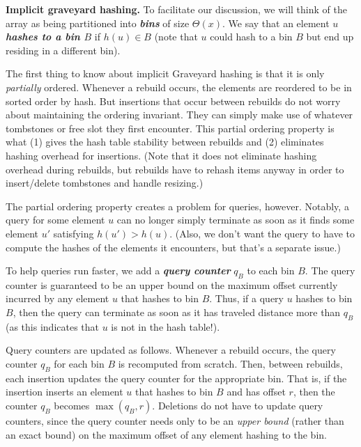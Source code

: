 \documentclass[10pt]{article}
\theoremstyle{remark}
\theoremstyle{remark}
\newcommand{\defn}[1]{\textbf{\emph{#1}}}
\renewcommand{\paragraph}[1]{\vspace{.2 cm} \noindent \textbf{#1}}
\begin{document}
\paragraph{Implicit graveyard hashing.}
To facilitate our discussion, we will think of the array as being partitioned into \defn{bins} of size $\Theta(x)$. We say that an element $u$ \defn{hashes to a bin $B$} if $h(u) \in B$ (note that $u$ could hash to a bin $B$ but end up residing in a different bin). 

The first thing to know about implicit Graveyard hashing is that it is only \emph{partially} ordered. Whenever a rebuild occurs, the elements are reordered to be in sorted order by hash. But insertions that occur between rebuilds do not worry about maintaining the ordering invariant. They can simply make use of whatever tombstones or free slot they first encounter. This partial ordering property is what (1) gives the hash table stability between rebuilds and (2) eliminates hashing overhead for insertions. (Note that it does not eliminate hashing overhead during rebuilds, but rebuilds have to rehash items anyway in order to insert/delete tombstones and handle resizing.)

The partial ordering property creates a problem for queries, however. Notably, a query for some element $u$ can no longer simply terminate as soon as it finds some element $u'$ satisfying $h(u') > h(u)$. (Also, we don't want the query to have to compute the hashes of the elements it encounters, but that's a separate issue.)

To help queries run faster, we add a \defn{query counter} $q_B$ to each bin $B$. The query counter is guaranteed to be an upper bound on the maximum offset currently incurred by any element $u$ that hashes to bin $B$. Thus, if a query $u$ hashes to bin $B$, then the query can terminate as soon as it has traveled distance more than $q_B$ (as this indicates that $u$ is not in the hash table!). 

Query counters are updated as follows. Whenever a rebuild occurs, the query counter $q_B$ for each bin $B$ is recomputed from scratch. Then, between rebuilds, each insertion updates the query counter for the appropriate bin. That is, if the insertion inserts an element $u$ that hashes to bin $B$ and has offset $r$, then the counter $q_B$ becomes $\max(q_B, r)$. Deletions do not have to update query counters, since the query counter needs only to be an \emph{upper bound} (rather than an exact bound) on the maximum 
offset of any element hashing to the bin. 
\end{document}
